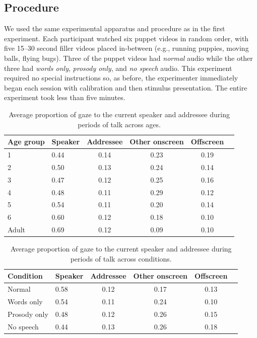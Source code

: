 \documentclass[authoryear, 12pt]{elsarticle}
\begin{document}
\subsection{Procedure}
We used the same experimental apparatus and procedure as in the first experiment. Each participant watched six puppet videos in random order, with five 15--30 second filler videos placed in-between (e.g., running puppies, moving balls, flying bugs). Three of the puppet videos had \textit{normal} audio while the other three had \textit{words only}, \textit{prosody only}, and \textit{no speech} audio. This experiment required no special instructions so, as before, the experimenter immediately began each session with calibration and then stimulus presentation. The entire experiment took less than five minutes.

\linespread{1}
\begin{table}[t]
\begin{center}
  \begin{tabular}{llcccc}
    \hline
    Age group & Speaker & Addressee & Other onscreen & Offscreen\\ 
    \hline
    1 & 0.44 & 0.14 & 0.23 & 0.19 \\ 
    2 & 0.50 & 0.13 & 0.24 & 0.14 \\ 
    3 & 0.47 & 0.12 & 0.25 & 0.16 \\ 
    4 & 0.48 & 0.11 & 0.29 & 0.12 \\ 
    5 & 0.54 & 0.11 & 0.20 & 0.14 \\ 
    6 & 0.60 & 0.12 & 0.18 & 0.10 \\
    Adult & 0.69 & 0.12 & 0.09 & 0.10 \\
    \hline
  \end{tabular}
\end{center}
  \caption{Average proportion of gaze to the current speaker and addressee during periods of talk across ages.}
\label{tab:look_e2}
\end{table}

\linespread{1}
\begin{table}
\begin{center}
  \begin{tabular}{llcccc}
    \hline
    Condition & Speaker & Addressee & Other onscreen & Offscreen\\ 
    \hline
    Normal 				& 0.58 & 0.12 & 0.17 & 0.13 \\ 
    Words only 		& 0.54 & 0.11 & 0.24 & 0.10 \\ 
    Prosody only 	& 0.48 & 0.12 & 0.26 & 0.15 \\ 
    No speech 		& 0.44 & 0.13 & 0.26 & 0.18 \\
    \hline
  \end{tabular}
\end{center}
  \caption{Average proportion of gaze to the current speaker and addressee during periods of talk across conditions.}
\label{tab:look_e2b}
\end{table}
\end{document}
